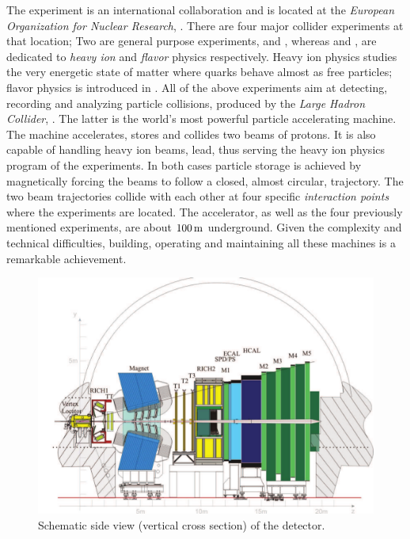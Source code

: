 
The \lhcb experiment is an international collaboration and is located at the {\it European Organization for Nuclear Research}, \cern.
There are four major collider experiments at that location; Two are general purpose experiments, \atlas and \cms, whereas
\alice and \lhcb, are dedicated to {\it heavy ion} and {\it flavor} physics respectively. Heavy ion physics
studies the very energetic state of matter where quarks behave almost as free particles;
flavor physics is introduced in . All of the above experiments aim at detecting,
recording and analyzing particle collisions, produced by the {\it Large Hadron Collider}, \lhc.
The latter is the world's most powerful particle accelerating machine.
The \lhc machine accelerates, stores and collides two beams of protons. It is also capable of handling
heavy ion beams, \eg lead, thus serving the heavy ion physics program of the experiments.
In both cases particle storage is achieved by magnetically forcing the beams to follow a closed, almost circular,
trajectory. The two beam trajectories collide with each other at four specific {\it interaction points}
where the experiments are located. The \lhc accelerator, as well as the four previously
mentioned experiments, are about $100\rm \,m$ underground. Given the complexity and technical difficulties,
building, operating and maintaining all these machines is a remarkable achievement.

\begin{figure}[t]
  \centering
  \includegraphics[width=1\textwidth]{Figures/Chapter2/detector_cross_cmyk}
  \caption{Schematic side view (vertical cross section) of the \lhcb detector.}
  \label{lhcb_detector_cross_section}
\end{figure}

